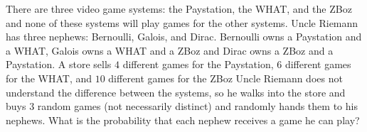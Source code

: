 There are three video game systems: the Paystation, the WHAT, and the ZBoz and none of these systems will play games for the other systems. Uncle Riemann has three nephews: Bernoulli, Galois, and Dirac. Bernoulli owns a Paystation and a WHAT, Galois owns a WHAT and a ZBoz and Dirac owns a ZBoz and a Paystation. A store sells $4$ diﬀerent games for the Paystation, $6$ diﬀerent games for the WHAT, and $10$ diﬀerent games for the ZBoz Uncle Riemann does not understand the diﬀerence between the systems, so he walks into the store and buys $3$ random games (not necessarily distinct) and randomly hands them to his nephews. What is the probability that each nephew receives a game he can play?
